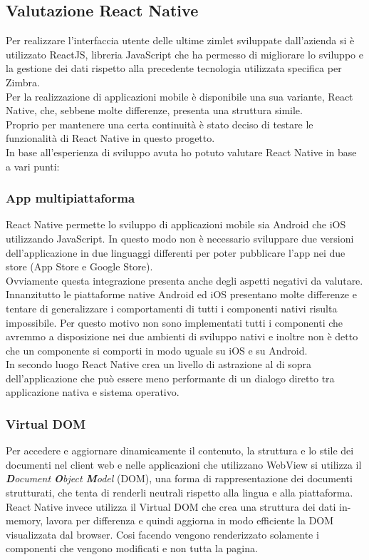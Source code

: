 \subsection{Valutazione React Native}
Per realizzare l'interfaccia utente delle ultime zimlet sviluppate dall'azienda si è utilizzato ReactJS, libreria JavaScript che ha permesso di migliorare lo sviluppo e la gestione dei dati rispetto alla precedente tecnologia utilizzata specifica per Zimbra. \\
Per la realizzazione di applicazioni mobile è disponibile una sua variante, React Native, che, sebbene molte differenze, presenta una struttura simile. \\
Proprio per mantenere una certa continuità è stato deciso di testare le funzionalità di React Native in questo progetto. \\
In base all'esperienza di sviluppo avuta ho potuto valutare React Native in base a vari punti:
\subsubsection{App multipiattaforma}
React Native permette lo sviluppo di applicazioni mobile sia Android che iOS utilizzando JavaScript. In questo modo non è necessario sviluppare due versioni dell'applicazione in due linguaggi differenti per poter pubblicare l'app nei due store (App Store e Google Store). \\
Ovviamente questa integrazione presenta anche degli aspetti negativi da valutare. Innanzitutto le piattaforme native Android ed iOS presentano molte differenze e tentare di generalizzare i comportamenti di tutti i componenti nativi risulta impossibile. Per questo motivo non sono implementati tutti i componenti che avremmo a disposizione nei due ambienti di sviluppo nativi e inoltre non è detto che un componente si comporti in modo uguale su iOS e su Android. \\
In secondo luogo React Native crea un livello di astrazione al di sopra dell’applicazione che può essere meno performante di un dialogo diretto tra applicazione nativa e sistema operativo.
\subsubsection{Virtual DOM}
Per accedere e aggiornare dinamicamente il contenuto, la struttura e lo stile dei documenti nel client web e nelle applicazioni che utilizzano WebView si utilizza il \emph{\textbf{D}ocument \textbf{O}bject \textbf{M}odel} (\acrshort{DOM}), una forma di rappresentazione dei documenti strutturati, che tenta di renderli neutrali rispetto alla lingua e alla piattaforma. React Native invece utilizza il Virtual DOM che crea una struttura dei dati in-memory, lavora per differenza e quindi aggiorna in modo efficiente la DOM visualizzata dal browser. Cosi facendo vengono renderizzato solamente i componenti che vengono modificati e non tutta la pagina.
